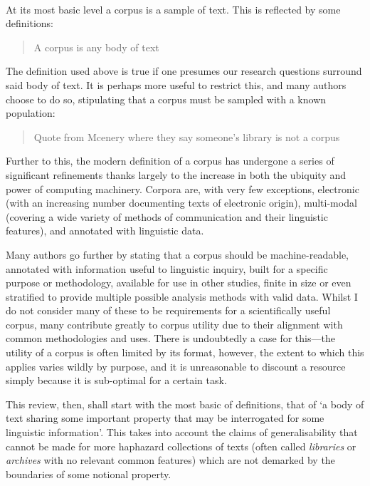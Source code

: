 \paragraph{}

At its most basic level a corpus is a sample of text.  This is reflected by some definitions:

\begin{quote}
A corpus is any body of text
\end{quote}

The definition used above is true if one presumes our research questions surround said body of text.  It is perhaps more useful to restrict this, and many authors choose to do so, stipulating that a corpus must be sampled with a known population:

\begin{quote}
Quote from Mcenery where they say someone's library is not a corpus
\end{quote}


Further to this, the modern definition of a corpus has undergone a series of significant refinements thanks largely to the increase in both the ubiquity and power of computing machinery.  Corpora are, with very few exceptions, electronic (with an increasing number documenting texts of electronic origin), multi-modal (covering a wide variety of methods of communication and their linguistic features), and annotated with linguistic data.

Many authors go further by stating that a corpus should be machine-readable, annotated with information useful to linguistic inquiry, built for a specific purpose or methodology, available for use in other studies, finite in size or even stratified to provide multiple possible analysis methods with valid data.  Whilst I do not consider many of these to be requirements for a scientifically useful corpus, many contribute greatly to corpus utility due to their alignment with common methodologies and uses.  There is undoubtedly a case for this---the utility of a corpus is often limited by its format, however, the extent to which this applies varies wildly by purpose, and it is unreasonable to discount a resource simply because it is sub-optimal for a certain task.


This review, then, shall start with the most basic of definitions, that of `a body of text sharing some important property that may be interrogated for some linguistic information'.  This takes into account the claims of generalisability that cannot be made for more haphazard collections of texts (often called \textsl{libraries} or \textsl{archives} with no relevant common features) which are not demarked by the boundaries of some notional property.









